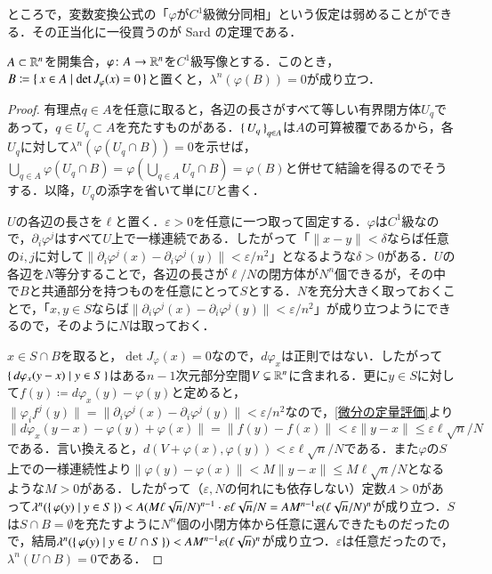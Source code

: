 ところで，変数変換公式の「$\varphi$が$C^1$級微分同相」という仮定は弱めることができる．その正当化に一役買うのが Sard の定理である．

\begin{thm}[Sard]
$A \subset \mathbb{R}^n$を開集合，$\varphi \colon A \to \mathbb{R}^n$を$C^1$級写像とする．このとき，$B \coloneqq \set{x \in A | \det J_\varphi(x) = 0}$と置くと，$\lambda^n(\varphi(B))=0$が成り立つ．
\end{thm}

\begin{proof}
有理点$q \in A$を任意に取ると，各辺の長さがすべて等しい有界閉方体$U_q$であって，$q \in U_q \subset A$を充たすものがある．$\set{U_q}_{q \in A}$は$A$の可算被覆であるから，各$U_q$に対して$\lambda^n(\varphi(U_q \cap B))=0$を示せば，$\bigcup_{q \in A} \varphi(U_q \cap B) = \varphi(\bigcup_{q \in A} U_q \cap B) = \varphi(B)$と併せて結論を得るのでそうする．以降，$U_q$の添字を省いて単に$U$と書く．

$U$の各辺の長さを$\ell$と置く．$\varepsilon > 0$を任意に一つ取って固定する．$\varphi$は$C^1$級なので，$\partial_i \varphi^j$はすべて$U$上で一様連続である．したがって「$\|x-y\| < \delta$ならば任意の$i,j$に対して$\|\partial_i\varphi^j(x) - \partial_i \varphi^j(y)\|< \varepsilon / n^2$」となるような$\delta > 0$がある．$U$の各辺を$N$等分することで，各辺の長さが$\ell / N$の閉方体が$N^n$個できるが，その中で$B$と共通部分を持つものを任意にとって$S$とする．$N$を充分大きく取っておくことで，「$x,y \in S$ならば$\|\partial_i\varphi^j(x) - \partial_i \varphi^j(y)\|< \varepsilon / n^2$」が成り立つようにできるので，そのように$N$は取っておく．

$x \in S \cap B$を取ると，$\det J_\varphi (x) = 0$なので，$d\varphi_x$は正則ではない．したがって$\set{ d\varphi_x (y-x) | y \in S }$はある$n-1$次元部分空間$V \subsetneq \mathbb{R}^n$に含まれる．更に$y \in S$に対して$f(y) \coloneqq d\varphi_x(y) - \varphi(y)$と定めると，$\|\varphi_i f^j(y)\| = \|\partial_i\varphi^j(x) - \partial_i \varphi^j(y)\| < \varepsilon / n^2$なので，\cref{微分の定量評価}より$\|d\varphi_x(y-x) - \varphi(y) + \varphi(x)\| = \|f(y)-f(x)\| < \varepsilon \|y-x\| \leq \varepsilon \ell \sqrt{n} / N$である．言い換えると，$d(V+\varphi(x), \varphi(y)) < \varepsilon \ell \sqrt{n} / N$である．また$\varphi$の$S$上での一様連続性より$\|\varphi(y)-\varphi(x)\| < M \|y-x\| \leq M \ell \sqrt{n} / N$となるような$M > 0$がある．したがって（$\varepsilon, N$の何れにも依存しない）定数$A > 0$があって$\lambda^n( \set{\varphi(y) | y \in S}) < A (M \ell \sqrt{n} / N)^{n-1} \cdot \varepsilon \ell \sqrt{n} / N = AM^{n-1} \varepsilon (\ell \sqrt{n}/N)^n $が成り立つ．$S$は$S \cap B = \emptyset$を充たすように$N^n$個の小閉方体から任意に選んできたものだったので，結局$\lambda^n( \set{\varphi(y) | y \in U \cap S}) < AM^{n-1} \varepsilon (\ell \sqrt{n})^n$が成り立つ．$\varepsilon$は任意だったので，$\lambda^n(U \cap B) = 0$である．
\end{proof}

